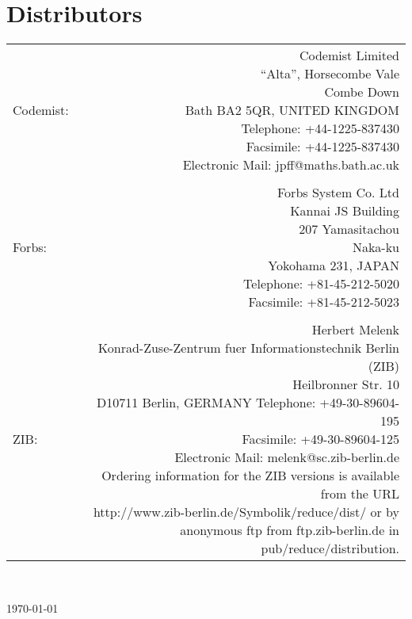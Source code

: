 \section*{{\REDUCE} Distributors}
\begin{tabular}{l r}

Codemist: & \parbox[t]{\infoboxwidth}{

Codemist Limited                                     \\
``Alta'', Horsecombe Vale                            \\
Combe Down                                           \\
Bath BA2 5QR, UNITED KINGDOM                         \\
Telephone: +44-1225-837430                            \\
Facsimile: +44-1225-837430                            \\
Electronic Mail: jpff@maths.bath.ac.uk}           \\ \\

Forbs: & \parbox[t]{\infoboxwidth}{

Forbs System Co. Ltd         \\
Kannai JS Building           \\
207 Yamasitachou             \\
Naka-ku                      \\
Yokohama 231, JAPAN          \\
Telephone: +81-45-212-5020   \\
Facsimile: +81-45-212-5023}  \\ \\

ZIB: & \parbox[t]{\infoboxwidth}{

Herbert Melenk                                               \\
Konrad-Zuse-Zentrum fuer Informationstechnik Berlin (ZIB)    \\
Heilbronner Str. 10                                          \\
D10711 Berlin, GERMANY
Telephone: +49-30-89604-195                                  \\
Facsimile: +49-30-89604-125                                  \\
Electronic Mail: melenk@sc.zib-berlin.de                     \\[3mm]
Ordering information for the ZIB versions is available from the URL \\
http://www.zib-berlin.de/Symbolik/reduce/dist/ or by
anonymous ftp from ftp.zib-berlin.de in pub/reduce/distribution.}

\end{tabular}   \\[0.15in]

\begin{flushright} \today \end{flushright}

